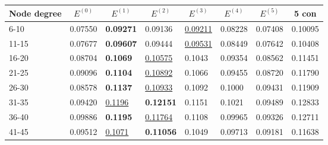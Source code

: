 \begin{table*}[]
    \centering
    \begin{tabular}{|l|l|l|l|l|l|l||l|}
        \hline
        Node degree & \multicolumn{1}{c|}{$E^{(0)}$} & \multicolumn{1}{c|}{$E^{(1)}$} & \multicolumn{1}{c|}{$E^{(2)}$} & \multicolumn{1}{c|}{$E^{(3)}$} & \multicolumn{1}{c|}{$E^{(4)}$} & \multicolumn{1}{c||}{$E^{(5)}$} & \multicolumn{1}{c|}{5 con} \\ \hline
        6-10        & 0.07550                        & \textbf{0.09271}               & 0.09136                        & \underline{0.09211}            & 0.08228                        & 0.07408                         & 0.10095                    \\ \hline
        11-15       & 0.07677                        & \textbf{0.09607}               & 0.09444                        & \underline{0.09531}            & 0.08449                        & 0.07642                         & 0.10408                    \\ \hline
        16-20       & 0.08704                        & \textbf{0.1069}                & \underline{0.10575}            & 0.1043                         & 0.09354                        & 0.08562                         & 0.11451                    \\ \hline
        21-25       & 0.09096                        & \textbf{0.1104}                & \underline{0.10892}            & 0.1066                         & 0.09455                        & 0.08720                         & 0.11790                    \\ \hline
        26-30       & 0.08578                        & \textbf{0.1137}                & \underline{0.10933}            & 0.1092                         & 0.1000                         & 0.09431                         & 0.11909                    \\ \hline
        31-35       & 0.09420                        & \underline{0.1196}             & \textbf{0.12151}               & 0.1151                         & 0.1021                         & 0.09489                         & 0.12833                    \\ \hline
        36-40       & 0.09886                        & \textbf{0.1195}                & \underline{0.11764}            & 0.1108                         & 0.09965                        & 0.09326                         & 0.12711                    \\ \hline
        41-45       & 0.09512                        & \underline{0.1071}             & \textbf{0.11056}               & 0.1049                         & 0.09713                        & 0.09181                         & 0.11638                    \\ \hline

\end{tabular}
\end{table*}
